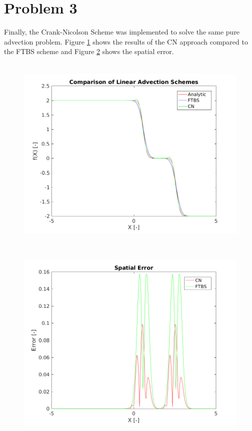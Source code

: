 \documentclass[12pt]{article}
\begin{document}
	\section{Problem 3}
	
	Finally, the Crank-Nicolson Scheme was implemented to solve the same pure advection problem. Figure \ref{fig:ftbs_CN} shows the results of the CN approach compared to the FTBS scheme and Figure \ref{fig:ftbs_CN_error} shows the spatial error.
	
	\begin{figure}[H]
		\centering
		\includegraphics[height=3.75in]{ftbs_CN.png}
		\label{fig:ftbs_CN}
		\caption{}
	\end{figure}
	
	\begin{figure}[H]
		\centering
		\includegraphics[height=3.75in]{ftbs_CN_error.png}
		\label{fig:ftbs_CN_error}
		\caption{}
	\end{figure}
	





		
	
	
	
	
\end{document}
